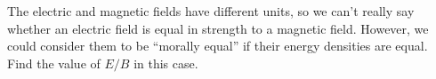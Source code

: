 The electric and magnetic fields have different units, so we can't really say whether
an electric field is equal in strength to a magnetic field. However, we could consider
them to be ``morally equal'' if their energy densities are equal. Find the value of
$E/B$ in this case.

